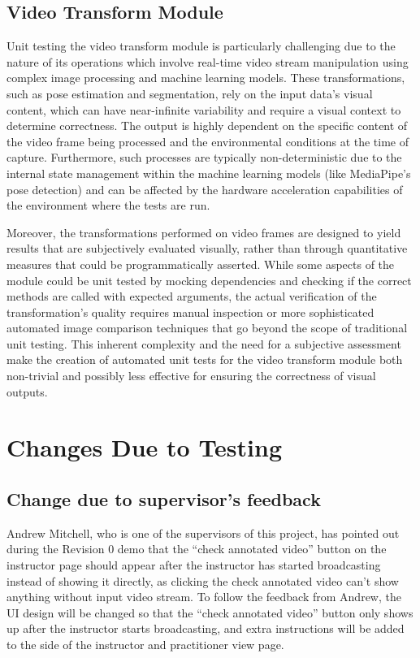 \documentclass[12pt, titlepage]{article}
\begin{document}
\subsection{Video Transform Module}

Unit testing the video transform module is particularly challenging due to the
nature of its operations which involve real-time video stream manipulation using
complex image processing and machine learning models. These transformations,
such as pose estimation and segmentation, rely on the input data's visual
content, which can have near-infinite variability and require a visual context
to determine correctness. The output is highly dependent on the specific content
of the video frame being processed and the environmental conditions at the time
of capture. Furthermore, such processes are typically non-deterministic due to
the internal state management within the machine learning models (like
MediaPipe's pose detection) and can be affected by the hardware acceleration
capabilities of the environment where the tests are run.

Moreover, the transformations performed on video frames are designed to yield
results that are subjectively evaluated visually, rather than through
quantitative measures that could be programmatically asserted. While some
aspects of the module could be unit tested by mocking dependencies and checking
if the correct methods are called with expected arguments, the actual
verification of the transformation's quality requires manual inspection or more
sophisticated automated image comparison techniques that go beyond the scope of
traditional unit testing. This inherent complexity and the need for a subjective
assessment make the creation of automated unit tests for the video transform
module both non-trivial and possibly less effective for ensuring the correctness
of visual outputs.

\section{Changes Due to Testing}

\subsection{Change due to supervisor's feedback}

Andrew Mitchell, who is one of the supervisors of this project, has pointed out
during the Revision 0 demo that the “check annotated video” button on the
instructor page should appear after the instructor has started broadcasting
instead of showing it directly, as clicking the check annotated video can’t show
anything without input video stream. To follow the feedback from Andrew, the UI
design will be changed so that the “check annotated video” button only shows up
after the instructor starts broadcasting, and extra instructions will be added
to the side of the instructor and practitioner view page.
\end{document}
